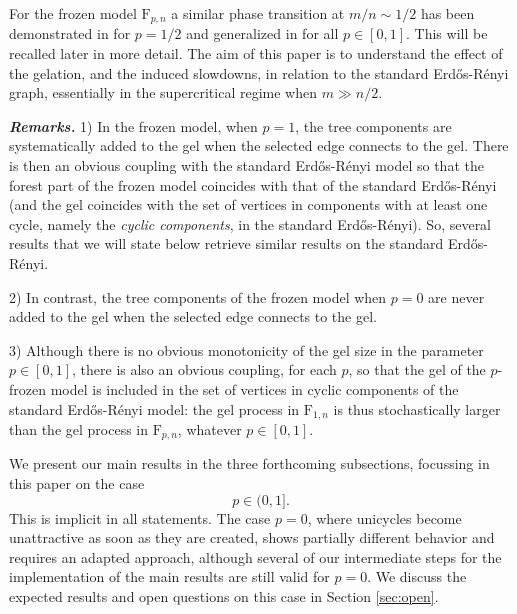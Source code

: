 \documentclass[a4, 11pt]{article}
\numberwithin{equation}{section}
\theoremstyle{plain}
\theoremstyle{definition}
\theoremstyle{remark}
\begin{document}
\bigskip

For the frozen model $\mathrm{F}_{p,n}$ a similar phase transition at $m/n\sim 1/2$ has been demonstrated in \cite{ContatCurien23} for $p=1/2$ and generalized in \cite{viau25} for all $p \in [0,1]$.  This will be recalled later in more detail. The aim of this paper is to understand the effect of the gelation, and the induced slowdowns, in relation to the standard Erd\H{o}s-R\'enyi graph, essentially in the supercritical regime when $m \gg n/2$.

\bigskip

\emph{\textbf{Remarks.}}  1) In the frozen model, when $p=1$, the tree components are systematically added to the gel when the selected edge connects to the gel. There is then an obvious coupling with the standard Erd\H{o}s-R\'enyi  model so that the forest part of the frozen model coincides with that of the standard Erd\H{o}s-R\'enyi (and the gel coincides with the set of vertices in components with at least one cycle, namely the \emph{cyclic components}, in the  standard Erd\H{o}s-R\'enyi). So, several results that we will state below retrieve similar results on the standard Erd\H{o}s-R\'enyi. 

\vspace{-0.1cm}

2) In contrast, the tree components of the frozen model when $p=0$ are never added to the gel when the selected edge connects to  the gel. 

\vspace{-0.1cm}

3) Although there is no obvious monotonicity of the gel size in the parameter $p\in [0,1]$, there is also an obvious coupling, for each $p$,  so that the gel of the $p$-frozen model is included in the set of vertices in cyclic components of the standard Erd\H{o}s-R\'enyi model: the gel process in $\mathrm{F}_{1,n}$ is thus stochastically larger than the gel process in $\mathrm{F}_{p,n}$, whatever $p\in [0,1]$.

\bigskip


We present our main results in the three forthcoming subsections, focussing in this paper on the case 
$$
p \in (0,1].
$$
This is implicit in all statements.
The case $p=0$, where unicycles become unattractive as soon as they are created, shows partially different behavior and requires an adapted approach, although several of our intermediate steps for the implementation of the main results are still valid for $p=0$. We discuss the expected results and open questions on this case  in Section \ref{sec:open}.
\end{document}
